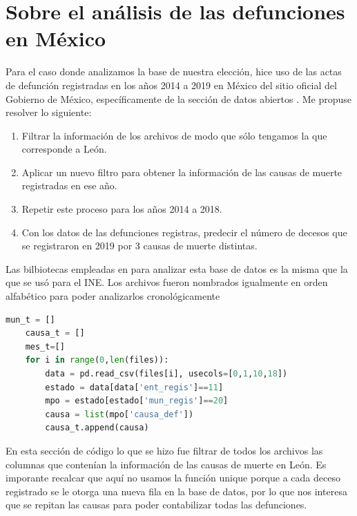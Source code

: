 \documentclass[12pt,letterpaper]{article}
\begin{document}
\section{Sobre el análisis de las defunciones en México}
Para el caso donde analizamos la base de nuestra elección, hice uso de las actas de defunción registradas en los años 2014 a 2019 en México del sitio oficial del Gobierno de México, específicamente de la sección de datos abiertos \cite{Defunciones}. Me propuse resolver lo siguiente:  
\begin{enumerate}
    \item Filtrar la información de los archivos de modo que sólo tengamos la que corresponde a León. 
    \item Aplicar un nuevo filtro para obtener la información de las causas de muerte registradas en ese año.  
    \item Repetir este proceso para los años 2014 a 2018.
    \item Con los datos de las defunciones registras, predecir el número de decesos que se registraron en 2019 por 3 causas de muerte distintas. 
\end{enumerate}

Las bilbiotecas empleadas en para analizar esta base de datos es la misma que la que se usó para el INE. Los archivos fueron nombrados igualmente en orden alfabético para poder analizarlos cronológicamente 
\scriptsize{\begin{lstlisting}[language=Python]
    mun_t = []
    causa_t = []
    mes_t=[]
    for i in range(0,len(files)):
        data = pd.read_csv(files[i], usecols=[0,1,10,18])
        estado = data[data['ent_regis']==11]
        mpo = estado[estado['mun_regis']==20]
        causa = list(mpo['causa_def'])
        causa_t.append(causa)
\end{lstlisting}}
\normalsize{En esta sección de código lo que se hizo fue filtrar de todos los archivos las columnas que contenían la información de las causas de muerte en León. Es imporante recalcar que aquí no usamos la función unique porque a cada deceso registrado se le otorga una nueva fila en la base de datos, por lo que nos interesa que se repitan las causas para poder contabilizar todas las defunciones.}\\
\end{document}
